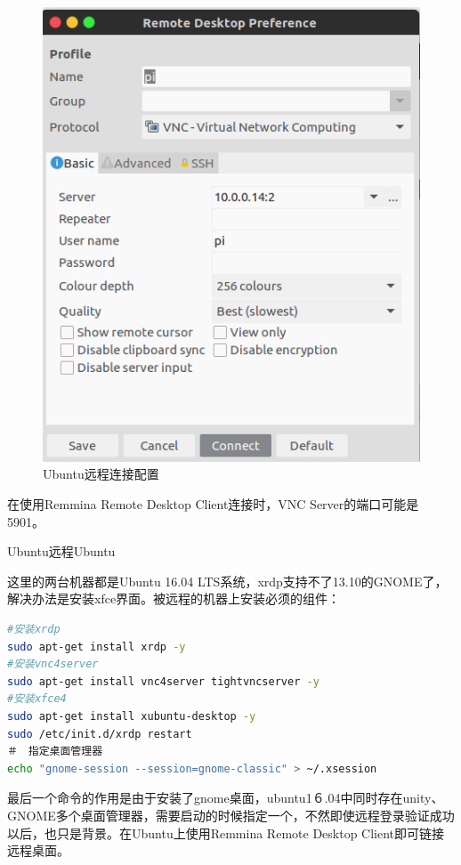 \documentclass[12pt]{book}
\makeatletter
\numberwithin{dummy}{section}
\theoremstyle{ocrenumbox}
\theoremstyle{blacknumex}
\theoremstyle{blacknumbox}
\theoremstyle{ocrenum}
\renewcommand{\subsection}{\@startsection {subsection}{2}{\z@}
	{-3ex \@plus -0.1ex \@minus -.4ex}
	{0.5ex \@plus.2ex }
	{\normalfont\sffamily\bfseries}}
\makeatother
\begin{document}
\begin{figure}[htbp]
	\centering
	\includegraphics[scale=0.4]{raspberryremtoeconfig.png}
	\caption{Ubuntu远程连接配置}
	\label{fig:raspberryremtoeconfig}
\end{figure}

在使用Remmina Remote Desktop Client连接时，VNC Server的端口可能是5901。

\subsection{Ubuntu远程Ubuntu}

这里的两台机器都是Ubuntu 16.04 LTS系统，xrdp支持不了13.10的GNOME了，解决办法是安装xfce界面。被远程的机器上安装必须的组件：

\begin{lstlisting}[language=Bash]
#安装xrdp
sudo apt-get install xrdp -y
#安装vnc4server
sudo apt-get install vnc4server tightvncserver -y
#安装xfce4
sudo apt-get install xubuntu-desktop -y
sudo /etc/init.d/xrdp restart
＃　指定桌面管理器
echo "gnome-session --session=gnome-classic" > ~/.xsession
\end{lstlisting}

最后一个命令的作用是由于安装了gnome桌面，ubuntu1６.04中同时存在unity、GNOME多个桌面管理器，需要启动的时候指定一个，不然即使远程登录验证成功以后，也只是背景。在Ubuntu上使用Remmina Remote Desktop Client即可链接远程桌面。
\end{document}
